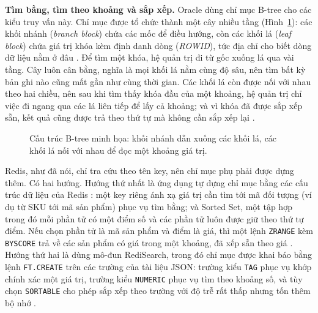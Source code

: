 \noindent\textbf{Tìm bằng, tìm theo khoảng và sắp xếp.} Oracle dùng chỉ mục B-tree cho các kiểu truy vấn này. Chỉ mục được tổ chức thành một cây nhiều tầng (Hình~\ref{fig:ix-btree}): các khối nhánh (\emph{branch block}) chứa các mốc để điều hướng, còn các khối lá (\emph{leaf block}) chứa giá trị khóa kèm định danh dòng (\emph{ROWID}), tức địa chỉ cho biết dòng dữ liệu nằm ở đâu \cite{oracleIndexes}. Để tìm một khóa, hệ quản trị đi từ gốc xuống lá qua vài tầng. Cây luôn cân bằng, nghĩa là mọi khối lá nằm cùng độ sâu, nên tìm bất kỳ bản ghi nào cũng mất gần như cùng thời gian. Các khối lá còn được nối với nhau theo hai chiều, nên sau khi tìm thấy khóa đầu của một khoảng, hệ quản trị chỉ việc đi ngang qua các lá liên tiếp để lấy cả khoảng; và vì khóa đã được sắp xếp sẵn, kết quả cũng được trả theo thứ tự mà không cần sắp xếp lại \cite{oracleIndexes}.

\begin{figure}[!htbp]
\centering
{}
\caption{Cấu trúc B-tree minh họa: khối nhánh dẫn xuống các khối lá, các khối lá nối với nhau để đọc một khoảng giá trị.}\label{fig:ix-btree}
\end{figure}

Redis, như đã nói, chỉ tra cứu theo tên key, nên chỉ mục phụ phải được dựng thêm. Có hai hướng. Hướng thứ nhất là ứng dụng tự dựng chỉ mục bằng các cấu trúc dữ liệu của Redis \cite{redisSecondaryIndexing}: một key riêng ánh xạ giá trị cần tìm tới mã đối tượng (ví dụ từ SKU tới mã sản phẩm) phục vụ tìm bằng; và Sorted Set, một tập hợp trong đó mỗi phần tử có một điểm số và các phần tử luôn được giữ theo thứ tự điểm. Nếu chọn phần tử là mã sản phẩm và điểm là giá, thì một lệnh \texttt{ZRANGE} kèm \texttt{BYSCORE} trả về các sản phẩm có giá trong một khoảng, đã xếp sẵn theo giá \cite{redisSecondaryIndexing}. Hướng thứ hai là dùng mô-đun RediSearch, trong đó chỉ mục được khai báo bằng lệnh \texttt{FT.CREATE} trên các trường của tài liệu JSON: trường kiểu \texttt{TAG} phục vụ khớp chính xác một giá trị, trường kiểu \texttt{NUMERIC} phục vụ tìm theo khoảng số, và tùy chọn \texttt{SORTABLE} cho phép sắp xếp theo trường với độ trễ rất thấp nhưng tốn thêm bộ nhớ \cite{redisFtCreate}.

